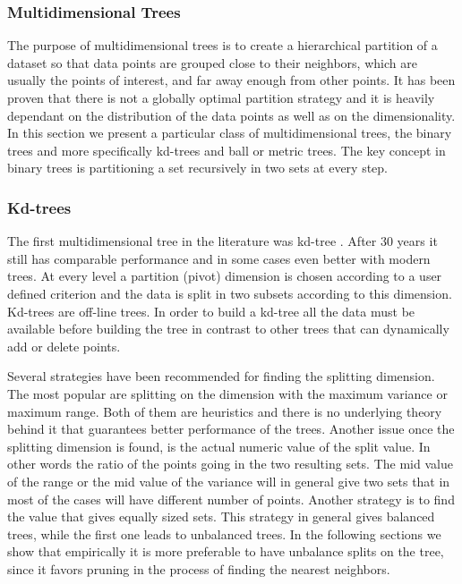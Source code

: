 \documentclass[12pt,letterpaper,doublespaced,ETD,dvips,proposal]{gtthesis}
\begin{document}
\begin{Body}
\subsubsection{Multidimensional Trees}
\label{Multidimensional_Trees}

The purpose of multidimensional trees is to create a hierarchical
partition of a dataset so that data points are grouped close to
their neighbors, which are usually the points of interest, and far
away enough from other points. It has been proven that there is not
a globally optimal partition strategy \cite{gyorfi2002dft}
and it is heavily dependant on the distribution of the data points
as well as on the dimensionality. In this section we present a particular
 class of multidimensional
trees, the binary trees and more specifically kd-trees and ball or
metric trees. The key concept in binary trees is partitioning a set
recursively in two sets at every step.

\subsubsection{Kd-trees}
\label{Kd_trees}

The first multidimensional tree in the literature was kd-tree \cite{bentley1975bst}. After
30 years it still has comparable performance and in some cases even
better with modern trees. At every level a partition (pivot)
dimension is chosen according to a user defined criterion and the
data is split in two subsets according to this dimension. Kd-trees
are off-line trees. In order to build a kd-tree all the data must be
available before building the tree in contrast to other trees that
can dynamically add or delete points.

Several strategies have been recommended for finding the splitting
dimension. The most popular are splitting on the dimension with the
maximum variance or maximum range. Both of them are heuristics and
there is no underlying theory behind it that guarantees better
performance of the trees. Another issue once the splitting dimension
is found, is the actual numeric value of the split value. In other words
the ratio of the points going in the two resulting sets. The mid
value of the range or the mid value of the variance will in general
give two sets that in most of the cases will have different number
of points. Another strategy is to find the value that gives equally
sized sets. This strategy in general gives balanced trees, while the
first one leads to unbalanced trees. In the following sections we
show that empirically it is more preferable to have unbalance splits
on the tree, since it favors pruning in the process of finding the
nearest neighbors.


\end{Body}
\end{document}
